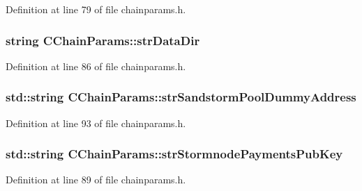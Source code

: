 Definition at line 79 of file chainparams.\+h.

\hypertarget{class_c_chain_params_ac426f66d4f4cf1c62151839a3f766d47}{}
\subsubsection[{str\+Data\+Dir}]{\setlength{\rightskip}{0pt plus 5cm}string C\+Chain\+Params\+::str\+Data\+Dir\hspace{0.3cm}{\ttfamily [protected]}}\label{class_c_chain_params_ac426f66d4f4cf1c62151839a3f766d47}


Definition at line 86 of file chainparams.\+h.

\hypertarget{class_c_chain_params_aefacc57cc8df894c78529dbadcf7fc20}{}
\subsubsection[{str\+Sandstorm\+Pool\+Dummy\+Address}]{\setlength{\rightskip}{0pt plus 5cm}std\+::string C\+Chain\+Params\+::str\+Sandstorm\+Pool\+Dummy\+Address\hspace{0.3cm}{\ttfamily [protected]}}\label{class_c_chain_params_aefacc57cc8df894c78529dbadcf7fc20}


Definition at line 93 of file chainparams.\+h.

\hypertarget{class_c_chain_params_a3ade9f41f8926331f4eb6aa1417444d3}{}
\subsubsection[{str\+Stormnode\+Payments\+Pub\+Key}]{\setlength{\rightskip}{0pt plus 5cm}std\+::string C\+Chain\+Params\+::str\+Stormnode\+Payments\+Pub\+Key\hspace{0.3cm}{\ttfamily [protected]}}\label{class_c_chain_params_a3ade9f41f8926331f4eb6aa1417444d3}


Definition at line 89 of file chainparams.\+h.

